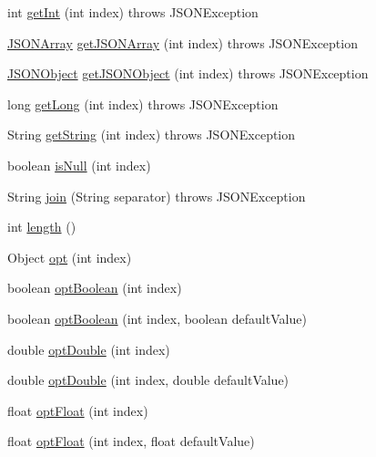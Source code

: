 \begin{DoxyCompactItemize}
\item 
int \hyperlink{classorg_1_1json_1_1JSONArray_a1698dd185adbfa34dde18b2bef7f1e15}{get\-Int} (int index)  throws J\-S\-O\-N\-Exception 
\item 
\hyperlink{classorg_1_1json_1_1JSONArray}{J\-S\-O\-N\-Array} \hyperlink{classorg_1_1json_1_1JSONArray_a5d52943e4ca5982916b61aaa898dadad}{get\-J\-S\-O\-N\-Array} (int index)  throws J\-S\-O\-N\-Exception 
\item 
\hyperlink{classorg_1_1json_1_1JSONObject}{J\-S\-O\-N\-Object} \hyperlink{classorg_1_1json_1_1JSONArray_a7f3e6fc64826daba30f40964cd92e57e}{get\-J\-S\-O\-N\-Object} (int index)  throws J\-S\-O\-N\-Exception 
\item 
long \hyperlink{classorg_1_1json_1_1JSONArray_a7d8cb28bbbcc4d3a3b00700a12331b94}{get\-Long} (int index)  throws J\-S\-O\-N\-Exception 
\item 
String \hyperlink{classorg_1_1json_1_1JSONArray_a3b52ac3d94f48cdddf503e7872653591}{get\-String} (int index)  throws J\-S\-O\-N\-Exception 
\item 
boolean \hyperlink{classorg_1_1json_1_1JSONArray_a53362530300e3530297eb8ddaf74098d}{is\-Null} (int index)
\item 
String \hyperlink{classorg_1_1json_1_1JSONArray_ad0fbfe8fea05cdf7f06ddfe20db7c8c6}{join} (String separator)  throws J\-S\-O\-N\-Exception 
\item 
int \hyperlink{classorg_1_1json_1_1JSONArray_a8382a78090007f650a02895ecbf3c8ec}{length} ()
\item 
Object \hyperlink{classorg_1_1json_1_1JSONArray_a19aa83c80cded3d0a252c212ceca7954}{opt} (int index)
\item 
boolean \hyperlink{classorg_1_1json_1_1JSONArray_a157f9232dea069ba4d201d1eba431084}{opt\-Boolean} (int index)
\item 
boolean \hyperlink{classorg_1_1json_1_1JSONArray_adf119f56ddd47c4b9703f44efac4c3ef}{opt\-Boolean} (int index, boolean default\-Value)
\item 
double \hyperlink{classorg_1_1json_1_1JSONArray_ae1cb586b1d073252a0ac07b6965f7a08}{opt\-Double} (int index)
\item 
double \hyperlink{classorg_1_1json_1_1JSONArray_a0e12afede9c6e7be4ca467ce48171d17}{opt\-Double} (int index, double default\-Value)
\item 
float \hyperlink{classorg_1_1json_1_1JSONArray_aa962b2093432ea13c1ea56e247b40dee}{opt\-Float} (int index)
\item 
float \hyperlink{classorg_1_1json_1_1JSONArray_aeddbb8446df12476c6d81745bbe171b9}{opt\-Float} (int index, float default\-Value)

\end{DoxyCompactItemize}
